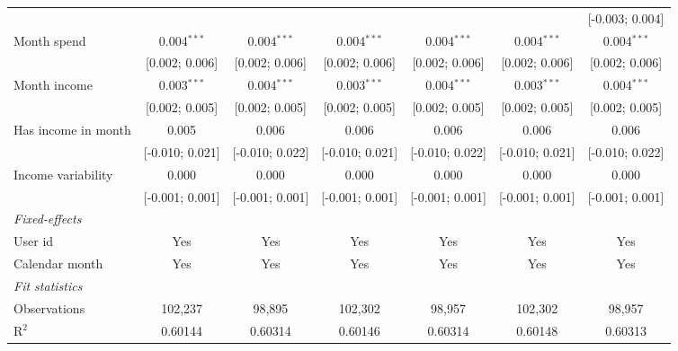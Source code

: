 \begin{table}[htbp]
\begin{threeparttable}[b]
\begin{tabular}{lcccccc}
                                          &                 &                 &                 &                 &                 & [-0.003; 0.004]\\   
         Month spend                      & 0.004$^{***}$   & 0.004$^{***}$   & 0.004$^{***}$   & 0.004$^{***}$   & 0.004$^{***}$   & 0.004$^{***}$\\   
                                          & [0.002; 0.006]  & [0.002; 0.006]  & [0.002; 0.006]  & [0.002; 0.006]  & [0.002; 0.006]  & [0.002; 0.006]\\   
         Month income                     & 0.003$^{***}$   & 0.004$^{***}$   & 0.003$^{***}$   & 0.004$^{***}$   & 0.003$^{***}$   & 0.004$^{***}$\\   
                                          & [0.002; 0.005]  & [0.002; 0.005]  & [0.002; 0.005]  & [0.002; 0.005]  & [0.002; 0.005]  & [0.002; 0.005]\\   
         Has income in month              & 0.005           & 0.006           & 0.006           & 0.006           & 0.006           & 0.006\\   
                                          & [-0.010; 0.021] & [-0.010; 0.022] & [-0.010; 0.021] & [-0.010; 0.022] & [-0.010; 0.021] & [-0.010; 0.022]\\   
         Income variability               & 0.000           & 0.000           & 0.000           & 0.000           & 0.000           & 0.000\\   
                                          & [-0.001; 0.001] & [-0.001; 0.001] & [-0.001; 0.001] & [-0.001; 0.001] & [-0.001; 0.001] & [-0.001; 0.001]\\   
         \midrule
         \emph{Fixed-effects}\\
         User id                          & Yes             & Yes             & Yes             & Yes             & Yes             & Yes\\  
         Calendar month                   & Yes             & Yes             & Yes             & Yes             & Yes             & Yes\\  
         \midrule
         \emph{Fit statistics}\\
         Observations                     & 102,237         & 98,895          & 102,302         & 98,957          & 102,302         & 98,957\\  
         R$^2$                            & 0.60144         & 0.60314         & 0.60146         & 0.60314         & 0.60148         & 0.60313\\  

\end{tabular}
\end{threeparttable}
\end{table}
